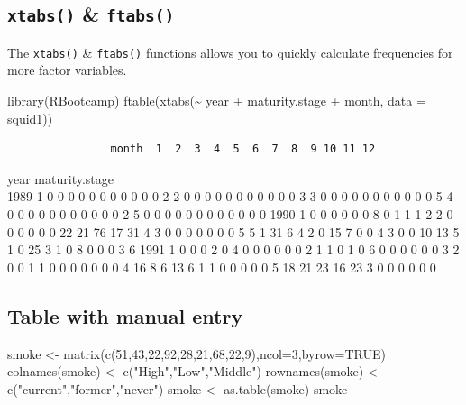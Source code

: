 \documentclass[
]{book}
\newenvironment{Shaded}{\begin{snugshade}}{\end{snugshade}}
\newcommand{\AttributeTok}[1]{\textcolor[rgb]{0.77,0.63,0.00}{#1}}
\newcommand{\ConstantTok}[1]{\textcolor[rgb]{0.00,0.00,0.00}{#1}}
\newcommand{\DecValTok}[1]{\textcolor[rgb]{0.00,0.00,0.81}{#1}}
\newcommand{\FunctionTok}[1]{\textcolor[rgb]{0.00,0.00,0.00}{#1}}
\newcommand{\NormalTok}[1]{#1}
\newcommand{\OtherTok}[1]{\textcolor[rgb]{0.56,0.35,0.01}{#1}}
\newcommand{\SpecialCharTok}[1]{\textcolor[rgb]{0.00,0.00,0.00}{#1}}
\newcommand{\StringTok}[1]{\textcolor[rgb]{0.31,0.60,0.02}{#1}}
\begin{document}
\hypertarget{xtabs-ftabs}{%
\subsection{\texorpdfstring{\texttt{xtabs()} \& \texttt{ftabs()}}{xtabs() \& ftabs()}}\label{xtabs-ftabs}}

The \texttt{xtabs()} \& \texttt{ftabs()} functions allows you to quickly calculate frequencies for more factor variables.

\begin{Shaded}
\begin{Highlighting}[]
\FunctionTok{library}\NormalTok{(RBootcamp)}
\FunctionTok{ftable}\NormalTok{(}\FunctionTok{xtabs}\NormalTok{(}\SpecialCharTok{\textasciitilde{}}\NormalTok{ year }\SpecialCharTok{+}\NormalTok{ maturity.stage }\SpecialCharTok{+}\NormalTok{ month, }\AttributeTok{data =}\NormalTok{ squid1))}
\end{Highlighting}
\end{Shaded}

\begin{verbatim}
                month  1  2  3  4  5  6  7  8  9 10 11 12
\end{verbatim}

year maturity.stage\\
1989 1 0 0 0 0 0 0 0 0 0 0 0 2
2 0 0 0 0 0 0 0 0 0 0 0 3
3 0 0 0 0 0 0 0 0 0 0 0 5
4 0 0 0 0 0 0 0 0 0 0 0 2
5 0 0 0 0 0 0 0 0 0 0 0 0
1990 1 0 0 0 0 0 0 8 0 1 1 1 2
2 0 0 0 0 0 0 22 21 76 17 31 4
3 0 0 0 0 0 0 0 5 5 1 31 6
4 2 0 15 7 0 0 4 3 0 0 10 13
5 1 0 25 3 1 0 8 0 0 0 3 6
1991 1 0 0 0 2 0 4 0 0 0 0 0 0
2 1 1 0 1 0 6 0 0 0 0 0 0
3 2 0 0 1 1 0 0 0 0 0 0 0
4 16 8 6 13 6 1 1 0 0 0 0 0
5 18 21 23 16 23 3 0 0 0 0 0 0

\hypertarget{table-with-manual-entry}{%
\subsection{Table with manual entry}\label{table-with-manual-entry}}

\begin{Shaded}
\begin{Highlighting}[]
\NormalTok{smoke }\OtherTok{\textless{}{-}} \FunctionTok{matrix}\NormalTok{(}\FunctionTok{c}\NormalTok{(}\DecValTok{51}\NormalTok{,}\DecValTok{43}\NormalTok{,}\DecValTok{22}\NormalTok{,}\DecValTok{92}\NormalTok{,}\DecValTok{28}\NormalTok{,}\DecValTok{21}\NormalTok{,}\DecValTok{68}\NormalTok{,}\DecValTok{22}\NormalTok{,}\DecValTok{9}\NormalTok{),}\AttributeTok{ncol=}\DecValTok{3}\NormalTok{,}\AttributeTok{byrow=}\ConstantTok{TRUE}\NormalTok{)}
\FunctionTok{colnames}\NormalTok{(smoke) }\OtherTok{\textless{}{-}} \FunctionTok{c}\NormalTok{(}\StringTok{"High"}\NormalTok{,}\StringTok{"Low"}\NormalTok{,}\StringTok{"Middle"}\NormalTok{)}
\FunctionTok{rownames}\NormalTok{(smoke) }\OtherTok{\textless{}{-}} \FunctionTok{c}\NormalTok{(}\StringTok{"current"}\NormalTok{,}\StringTok{"former"}\NormalTok{,}\StringTok{"never"}\NormalTok{)}
\NormalTok{smoke }\OtherTok{\textless{}{-}} \FunctionTok{as.table}\NormalTok{(smoke)}
\NormalTok{smoke}
\end{Highlighting}
\end{Shaded}
\end{document}

